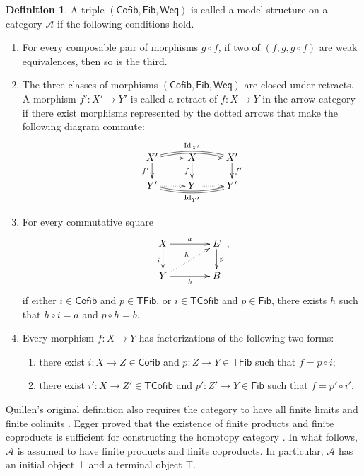 \documentclass[10pt,a4paper]{amsart}
\theoremstyle{plain}
\theoremstyle{definition}
\newtheorem{definition}[theorem]{Definition}
\theoremstyle{remark}
\begin{document}
\begin{definition}\label{def:model-structure}
  A triple $(\mathsf{Cofib},\mathsf{Fib},\mathsf{Weq})$ is called a model structure on a category $\mathcal A$ if the following conditions hold.
  \begin{enumerate}
    \item[CM1] For every composable pair of morphisms $g \circ f$, if two of $(f,g,g \circ f)$ are weak equivalences, then so is the third.
    \item[CM2] The three classes of morphisms $(\mathsf{Cofib},\mathsf{Fib},\mathsf{Weq})$ are closed under retracts.
          A morphism $f' : X' \longrightarrow Y'$ is called a retract of $f : X \longrightarrow Y$ in the arrow category if there exist morphisms represented by the dotted arrows that make the following diagram commute:
          \[
            \xymatrix@R=15pt{
            X' \ar@{.>}[r] \ar@{->}[d]_-{f'} \ar@/^/@{=}[rr]^{\operatorname{Id}_{X'}} & X \ar@{.>}[r] \ar@{->}[d]_-{f} & X' \ar@{->}[d]^-{f'} \\
            Y' \ar@{.>}[r] \ar@/_/@{=}[rr]_{\operatorname{Id}_{Y'}} & Y \ar@{.>}[r] & Y'
            }
          \]
    \item[CM3] For every commutative square
          \[
            \xymatrix@C=14mm@R=7mm{
            X\ar[r]^a\ar[d]_i&E\ar[d]^p\\
            Y\ar[r]_b\ar@{..>}[ur]^h&B
            },
          \]
          if either $i\in\mathsf{Cofib}$ and $p \in \mathsf{TFib}$, or $i \in \mathsf{TCofib}$ and $p \in \mathsf{Fib}$, there exists $h$ such that $h\circ i=a$ and $p\circ h=b$.
    \item[CM4] Every morphism $f : X \longrightarrow Y$ has factorizations of the following two forms:
          \begin{enumerate}
            \item[(i)] there exist $i : X \longrightarrow Z \in \mathsf{Cofib}$ and $p : Z \longrightarrow Y \in \mathsf{TFib}$ such that $f = p \circ i$;
            \item[(ii)] there exist $i' : X \longrightarrow Z' \in \mathsf{TCofib}$ and $p' : Z' \longrightarrow Y \in \mathsf{Fib}$ such that $f = p' \circ i'$.
          \end{enumerate}
  \end{enumerate}
\end{definition}

Quillen's original definition also requires the category to have all finite limits and finite colimits \cite[Chapter~I, \S~1]{Quillen}.
Egger proved that the existence of finite products and finite coproducts is sufficient for constructing the homotopy category \cite[p.~1 and Theorem~3.2]{EggerModelCategories}.
In what follows, $\mathcal A$ is assumed to have finite products and finite coproducts.
In particular, $\mathcal A$ has an initial object $\bot$ and a terminal object $\top$.
\end{document}
